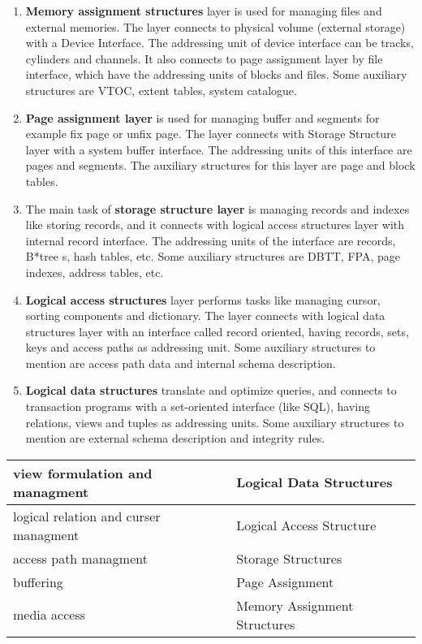 \begin{exercise}{14}
  \begin{subexercise}
    \begin{enumerate}
      \item \textbf{Memory assignment structures} layer is used for managing files and external memories. The layer connects to physical volume (external storage) with a Device Interface. The addressing unit of device interface can be tracks, cylinders and channels. It also connects to page assignment layer by file interface, which have the addressing units of blocks and files. Some auxiliary structures are VTOC, extent tables, system catalogue.

      \item \textbf{Page assignment layer} is used for managing buffer and segments for example fix page or unfix page. The layer connects with Storage Structure layer with a system buffer interface. The addressing units of this interface are pages and segments. The auxiliary structures for this layer are page and block tables.
      
      \item The main task of \textbf{storage structure layer} is managing records and indexes like storing records, and it connects with logical access structures layer with internal record interface. The addressing units of the interface are records, B*tree s, hash tables, etc. Some auxiliary structures are DBTT, FPA, page indexes, address tables, etc.

      \item \textbf{Logical access structures} layer performs tasks like managing cursor, sorting components and dictionary. The layer connects with logical data structures layer with an interface called record oriented, having records, sets, keys and access paths as addressing unit. Some auxiliary structures to mention are access path data and internal schema description. 

      \item \textbf{Logical data structures} translate and optimize queries, and connects to transaction programs with a set-oriented interface (like SQL), having relations, views and tuples as addressing units. Some auxiliary structures to mention are external schema description and integrity rules.

    \end{enumerate}
  \end{subexercise}
  \begin{subexercise}
    \centering
    \begin{tabular} { l | l }
      view formulation and managment & Logical Data Structures \\ \hline
      logical relation and curser managment & Logical Access Structure\\ \hline
      access path managment & Storage Structures\\ \hline
      buffering & Page Assignment\\ \hline
      media access & Memory Assignment Structures\\ \hline
      

\end{tabular}
\end{subexercise}
\end{exercise}
